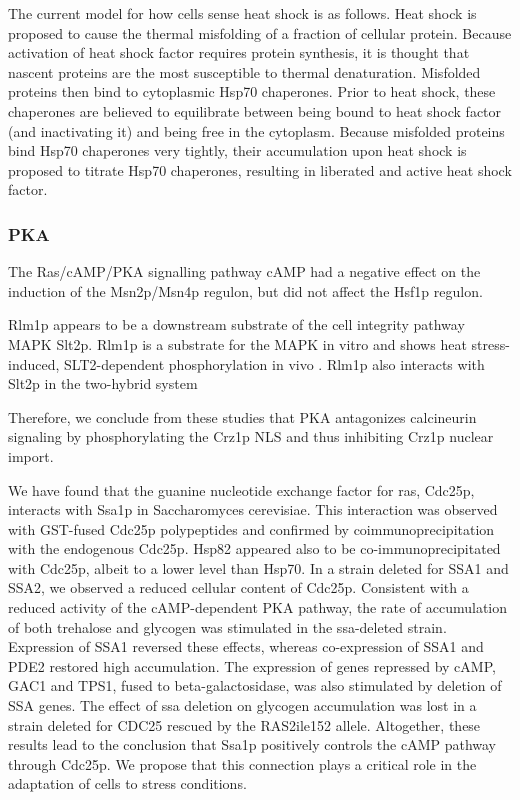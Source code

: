 \documentclass{pracamgr}
\begin{document}
The current model for how cells sense heat shock is as follows.
Heat shock is proposed to cause
the thermal misfolding of a fraction of cellular protein. Because
activation of heat shock factor requires protein synthesis, it is
thought that nascent proteins are the most susceptible to 
thermal denaturation. Misfolded proteins then bind to cytoplasmic
Hsp70 chaperones. Prior to heat shock, these chaperones are
believed to equilibrate between being bound to heat shock
factor (and inactivating it) and being free in the cytoplasm.
Because misfolded proteins bind Hsp70 chaperones very
tightly, their accumulation upon heat shock is proposed to
titrate Hsp70 chaperones, resulting in liberated and active
heat shock factor.\cite{MisfoldedProteins}

\subsubsection{PKA}
The Ras/cAMP/PKA signalling
pathway cAMP had a negative effect on the induction
of the Msn2p/Msn4p regulon, but did not affect the
Hsf1p regulon.\cite{MsnContraHsf1}

Rlm1p appears to be a downstream substrate of the cell integrity pathway MAPK Slt2p.
Rlm1p is a substrate for the MAPK in vitro and shows heat stress-induced, SLT2-dependent phosphorylation
in vivo . Rlm1p also interacts with Slt2p in the two-hybrid system\cite{MAPKinasePathways}

Therefore, we conclude from these studies that PKA antagonizes calcineurin signaling by phosphorylating the Crz1p NLS and thus inhibiting Crz1p nuclear import.\cite{PKAandCalcineurin}

We have found that the guanine nucleotide exchange factor for ras, Cdc25p, interacts with Ssa1p in Saccharomyces cerevisiae.
This interaction was observed with GST-fused Cdc25p polypeptides and confirmed by coimmunoprecipitation with the endogenous Cdc25p.
Hsp82 appeared also to be co-immunoprecipitated with Cdc25p, albeit to a lower level than Hsp70. In a strain deleted for SSA1 and SSA2,
we observed a reduced cellular content of Cdc25p. Consistent with a reduced activity of the cAMP-dependent PKA pathway, the rate of accumulation
of both trehalose and glycogen was stimulated in the ssa-deleted strain. Expression of SSA1 reversed these effects, whereas co-expression of SSA1
and PDE2 restored high accumulation. The expression of genes repressed by cAMP, GAC1 and TPS1, fused to beta-galactosidase, was also stimulated by 
deletion of SSA genes. The effect of ssa deletion on glycogen accumulation was lost in a strain deleted for CDC25 rescued by the RAS2ile152 allele.
Altogether, these results lead to the conclusion that Ssa1p positively controls the cAMP pathway through Cdc25p. We propose that this connection plays
a critical role in the adaptation of cells to stress conditions.\cite{Ssa1ControlscAmp}
\end{document}
